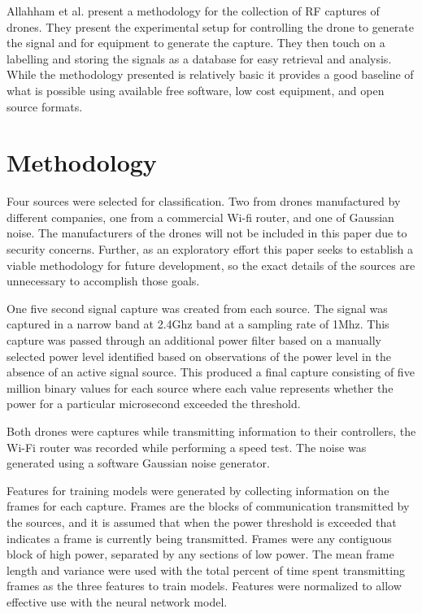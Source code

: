 \documentclass[12pt]{article}
\begin{document}
Allahham et al. \cite{DroneDataset} present a methodology for the collection of RF captures of drones. They present the experimental setup for controlling the drone to generate the signal and for equipment to generate the capture. They then touch on a labelling and storing the signals as a database for easy retrieval and analysis. While the methodology presented is relatively basic it provides a good baseline of what is possible using available free software, low cost equipment, and open source formats.

\section{Methodology}

Four sources were selected for classification. Two from drones manufactured by different companies, one from a commercial Wi-fi router, and one of Gaussian noise. The manufacturers of the drones will not be included in this paper due to security concerns. Further, as an exploratory effort this paper seeks to establish a viable methodology for future development, so the exact details of the sources are unnecessary to accomplish those goals.

One five second signal capture was created from each source. The signal was captured in a narrow band at 2.4Ghz band at a sampling rate of 1Mhz. This capture was passed through an additional power filter based on a manually selected power level identified based on observations of the power level in the absence of an active signal source. This produced a final capture consisting of five million binary values for each source where each value represents whether the power for a particular microsecond exceeded the threshold.

Both drones were captures while transmitting information to their controllers, the Wi-Fi router was recorded while performing a speed test. The noise was generated using a software Gaussian noise generator.

Features for training models were generated by collecting information on the frames for each capture. Frames are the blocks of communication transmitted by the sources, and it is assumed that when the power threshold is exceeded that indicates a frame is currently being transmitted. Frames were any contiguous block of high power, separated by any sections of low power. The mean frame length and variance were used with the total percent of time spent transmitting frames as the three features to train models. Features were normalized to allow effective use with the neural network model.
\end{document}
